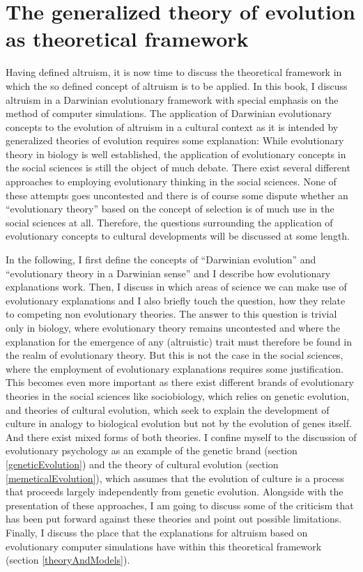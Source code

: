 \chapter{The generalized theory of evolution as theoretical framework}
\label{generalizedEvolution}

Having defined altruism, it is now time to discuss the theoretical
framework in which the so defined concept of altruism is to be
applied.  In this book, I discuss altruism in a Darwinian evolutionary
framework with special emphasis on the method of computer simulations.
The application of Darwinian evolutionary concepts to the evolution of
altruism in a cultural context as it is intended by generalized
theories of evolution requires some explanation: While evolutionary
theory in biology is well established, the application of evolutionary
concepts in the social sciences is still the object of much
debate. There exist several different approaches to employing
evolutionary thinking in the social sciences. None of these attempts
goes uncontested and there is of course some dispute whether an
``evolutionary theory'' based on the concept of selection is of much
use in the social sciences at all.  Therefore, the questions
surrounding the application of evolutionary concepts to cultural
developments will be discussed at some length.

In the following, I first define the concepts of ``Darwinian
evolution'' and ``evolutionary theory in a Darwinian sense'' and I
describe how evolutionary explanations work. Then, I discuss in which
areas of science we can make use of evolutionary explanations and I
also briefly touch the question, how they relate to competing non
evolutionary theories.  The answer to this question is trivial only in
biology, where evolutionary theory remains uncontested and where the
explanation for the emergence of any (altruistic) trait must therefore
be found in the realm of evolutionary theory. But this is not the case
in the social sciences, where the employment of evolutionary
explanations requires some justification.  This becomes even more
important as there exist different brands of evolutionary theories in
the social sciences like sociobiology, which relies on genetic
evolution, and theories of cultural evolution, which seek to explain
the development of culture in analogy to biological evolution but not
by the evolution of genes itself.  And there exist mixed forms of both
theories. I confine myself to the discussion of evolutionary
psychology as an example of the genetic brand (section
\ref{geneticEvolution}) and the theory of cultural evolution (section
\ref{memeticalEvolution}), which assumes that the evolution of culture
is a process that proceeds largely independently from genetic
evolution. Alongside with the presentation of these approaches, I am
going to discuss some of the criticism that has been put forward
against these theories and point out possible limitations. Finally, I
discuss the place that the explanations for altruism based on
evolutionary computer simulations have within this theoretical
framework (section \ref{theoryAndModels}).

